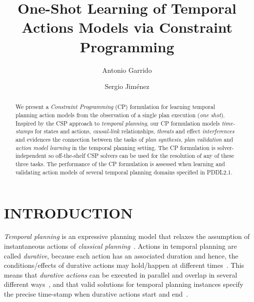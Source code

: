 \documentclass{ecai}
\begin{document}
\title{One-Shot Learning of Temporal Actions Models via Constraint Programming}
\author{Antonio Garrido \and Sergio Jim\'enez}
 
 
\maketitle

\begin{abstract}
  We present a {\em Constraint Programming} (CP) formulation for learning temporal planning  action models from the observation of a single plan execution ({\em one shot}). Inspired by the CSP approach to {\em temporal planning}, our CP formulation models {\em time-stamps} for states and actions, {\em causal-link} relationships, {\em threats} and effect {\em interferences} and evidences the connection between the tasks of {\em plan synthesis}, {\em plan validation} and {\em action model learning} in the temporal planning setting. The CP formulation is solver-independent so off-the-shelf CSP solvers can be used for the resolution of any of these three tasks. The performance of the CP formulation is assessed when learning and validating action models of several temporal planning domains specified in PDDL2.1. %
\end{abstract}



\section{INTRODUCTION}

{\em Temporal planning} is an expressive planning model that relaxes the assumption of instantaneous actions of {\em classical planning}~\cite{geffner2013concise}. Actions in temporal planning are called {\em durative}, because each action has an associated duration and hence, the conditions/effects of durative actions may hold/happen at different times~\cite{fox2003pddl2}. This means that {\em durative actions} can be executed in parallel and overlap in several different ways~\cite{cushing2007temporal}, and that valid solutions for temporal planning instances specify the precise time-stamp when durative actions start and end~\cite{howey2004val}.
\end{document}
